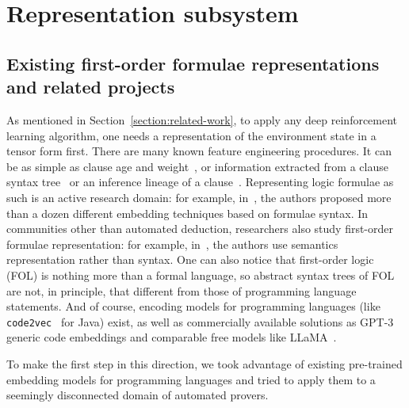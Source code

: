 \documentclass[runningheads]{llncs}
\begin{document}
\section{Representation subsystem}\label{section:representation-subsystem}
\subsection{Existing first-order formulae representations and related projects}
As mentioned in Section~\ref{section:related-work}, to apply any deep reinforcement learning algorithm, one needs a representation of the environment state in a tensor form first. There are many known feature engineering procedures. It can be as simple as clause age and weight~\cite{10.1007/978-3-030-29436-6_27}, or information extracted from a clause syntax tree~\cite{mockju-ecai20} or an inference lineage of a clause~\cite{10.1007/978-3-030-79876-5_31}. Representing logic formulae as such is an active research domain: for example, in~\cite{VectorRepresentations}, the authors proposed more than a dozen different embedding techniques based on formulae syntax. In communities other than automated deduction, researchers also study first-order formulae representation: for example, in~\cite{10.1007/978-3-031-21203-1_22}, the authors use semantics representation rather than syntax. One can also notice that first-order logic (FOL) is nothing more than a formal language, so abstract syntax trees of FOL are not, in principle, that different from those of programming language statements. And of course, encoding models for programming languages (like \texttt{code2vec}~\cite{alon2019code2vec} for Java) exist, as well as commercially available solutions as GPT-3~\cite{10.5555/3495724.3495883} generic code embeddings and comparable free models like LLaMA~\cite{DBLP:journals/corr/abs-2302-13971}.

To make the first step in this direction, we took advantage of existing pre-trained embedding models for programming languages and tried to apply them to a seemingly disconnected domain of automated provers.
\end{document}
